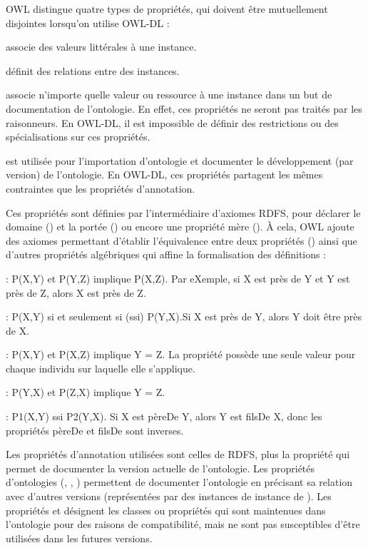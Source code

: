 OWL distingue quatre types de propriétés, qui doivent être mutuellement disjointes lorsqu'on utilise OWL-DL :
\begin{liste}
	\item {} associe des valeurs littérales à une instance.
	\item {} définit des relations entre des instances.
	\item {} associe n'importe quelle valeur ou ressource à une instance dans un but de documentation de l'ontologie. 
  En effet, ces propriétés ne seront pas traités par les raisonneurs.
  En OWL-DL, il est impossible de définir des restrictions ou des spécialisations sur ces propriétés.
	\item {} est utilisée pour l'importation d'ontologie et documenter le développement (par version) de l'ontologie.
	En OWL-DL, ces propriétés partagent les mêmes contraintes que les propriétés d'annotation.
\end{liste}

Ces propriétés sont définies par l'intermédiaire d'axiomes RDFS, pour déclarer le domaine () et la portée () ou encore une propriété mère ().
À cela, OWL ajoute des axiomes permettant d'établir l'équivalence entre deux propriétés () ainsi que d'autres propriétés algébriques qui affine la formalisation des définitions : 
\begin{liste}
  \item {}: P(X,Y) et P(Y,Z) implique P(X,Z). 
  Par eXemple, si X est près de Y et Y est près de Z, alors X est près de Z.
  \item {}: P(X,Y) si et seulement si (ssi) P(Y,X).Si X est près de Y, alors Y doit être près de X.
  \item {}: P(X,Y) et P(X,Z) implique Y = Z. 
  La propriété possède une seule valeur pour chaque individu sur laquelle elle s'applique.
  \item {}: P(Y,X) et P(Z,X) implique Y = Z.
  \item {}: P1(X,Y) ssi P2(Y,X). 
  Si X est pèreDe Y, alors Y est filsDe X, donc les propriétés pèreDe et filsDe sont inverses.
\end{liste}

Les propriétés d'annotation utilisées sont celles de RDFS, plus la propriété  qui permet de documenter la version actuelle de l'ontologie.
Les propriétés d'ontologies (, , ) permettent de documenter l'ontologie en précisant sa relation avec d'autres versions (représentées par des instances de instance de ).
Les propriétés  et  désignent les classes ou propriétés qui sont maintenues dans l'ontologie pour des raisons de compatibilité, mais ne sont pas susceptibles d'être utilisées dans les futures versions.

